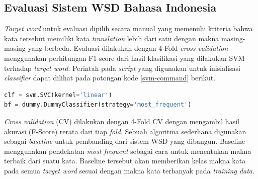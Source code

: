 \subsection{Evaluasi Sistem WSD Bahasa Indonesia}
\textit{Target word} untuk evaluasi dipilih secara manual yang memenuhi kriteria bahwa kata tersebut memiliki kata \textit{translation} lebih dari satu dengan makna masing-masing yang berbeda. Evaluasi dilakukan dengan 4-Fold \textit{cross validation} menggunakan perhitungan F1-score dari hasil klasifikasi yang dilakukan SVM terhadap \textit{target word}. Perintah pada \textit{script} yang digunakan untuk inisialisasi \textit{classifier} dapat dilihat pada potongan kode \ref{svm-command} berikut.

\begin{lstlisting}[language=python, caption={Inisialisasi SVM, baseline}, label={svm-command}]
clf = svm.SVC(kernel='linear')
bf = dummy.DummyClassifier(strategy='most_frequent')
\end{lstlisting}


\textit{Cross validation} (CV) dilakukan dengan 4-Fold CV dengan mengambil hasil akurasi (F-Score) rerata dari tiap \textit{fold}. Sebuah algoritma sederhana digunakan sebagai \textit{baseline} untuk pembanding dari sistem WSD yang dibangun. Baseline menggunakan pendekatan \textit{most frequent} sebagai cara untuk menentukan makna terbaik dari suatu kata. Baseline tersebut akan memberikan kelas makna kata pada semua \textit{target word} sesuai dengan makna kata terbanyak pada \textit{training data}.
